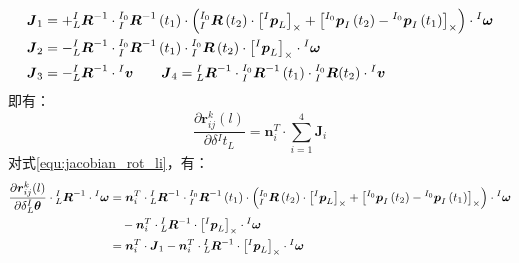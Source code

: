 \begin{equation}
  \begin{aligned}
     & \boldsymbol{J}_1=+{{^{I}_{L}}\boldsymbol{R}^{-1}}\cdot{{^{I_0}_{I}}\boldsymbol{R}^{-1}
      \left( t_1\right) }\cdot
    \left(
    {{^{I_0}_{I}}\boldsymbol{R}\left( t_2\right) }\cdot\left[ {^{I}\boldsymbol{p}_L} \right]_\times
    +\left[ {^{I_0}\boldsymbol{p}_I\left( t_2\right)}-{^{I_0}\boldsymbol{p}_I\left( t_1\right)} \right]_\times
    \right)
    \cdot{^{I}\boldsymbol{\omega}}
    \\
     & \boldsymbol{J}_2=-{{^{I}_{L}}\boldsymbol{R}^{-1}}\cdot{{^{I_0}_{I}}\boldsymbol{R}^{-1}
      \left( t_1\right) }\cdot{{^{I_0}_{I}}\boldsymbol{R}\left( t_2\right) }
    \cdot\left[ {^{I}\boldsymbol{p}_L} \right]_\times
    \cdot{^{I}\boldsymbol{\omega}}
    \\
     & \boldsymbol{J}_3=-{{^{I}_{L}}\boldsymbol{R}^{-1}}\cdot{^{I}\boldsymbol{v}}
    \quad\quad
    \boldsymbol{J}_4=
    {{^{I}_{L}}\boldsymbol{R}^{-1}}\cdot{{^{I_0}_{I}}\boldsymbol{R}^{-1}\left( t_1\right) }
    \cdot
    {^{I_0}_{I}\boldsymbol{R}}(t_2)\cdot{^{I}\boldsymbol{v}}
  \end{aligned}
\end{equation}
即有：
\begin{equation}
  \frac{\partial \boldsymbol{r}_{ij}^k(l)}{\partial \delta {^{I}t_{L}}}=
  \boldsymbol{n}_i^T\cdot\sum_{i=1}^{4}\boldsymbol{J}_i
\end{equation}
对式\ref{equ:jacobian_rot_li}，有：
\begin{equation}
  \begin{aligned}
    \frac{\partial \boldsymbol{r}_{ij}^k(l)}{\partial \delta {^{I}_{L}\boldsymbol{\theta}}}
    \cdot{{^{I}_{L}}\boldsymbol{R}^{-1}}\cdot{^{I}\boldsymbol{\omega}} & =
    \boldsymbol{n}_i^T\cdot
    {{^{I}_{L}}\boldsymbol{R}^{-1}}\cdot{{^{I_0}_{I}}\boldsymbol{R}^{-1}
      \left( t_1\right) }\cdot
    \left(
    {{^{I_0}_{I}}\boldsymbol{R}\left( t_2\right) }\cdot\left[ {^{I}\boldsymbol{p}_L} \right]_\times
    +\left[ {^{I_0}\boldsymbol{p}_I\left( t_2\right)}-{^{I_0}\boldsymbol{p}_I\left( t_1\right)} \right]_\times
    \right)
    \cdot{^{I}\boldsymbol{\omega}}
    \\&\quad-
    \boldsymbol{n}_i^T\cdot
    {{^{I}_{L}}\boldsymbol{R}^{-1}}\cdot\left[ {^{I}\boldsymbol{p}_L} \right]_\times\cdot{^{I}\boldsymbol{\omega}}
    \\&=\boldsymbol{n}_i^T\cdot\boldsymbol{J}_1-
    \boldsymbol{n}_i^T\cdot
    {{^{I}_{L}}\boldsymbol{R}^{-1}}\cdot\left[ {^{I}\boldsymbol{p}_L} \right]_\times\cdot{^{I}\boldsymbol{\omega}}
  \end{aligned}
\end{equation}
